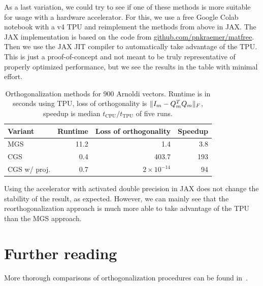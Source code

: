 \documentclass[11pt]{article}
\DeclarePairedDelimiter\norm{\lVert}{\rVert}
\begin{document}
As a last variation, we could try to see if one of these methods is more suitable for usage with a hardware accelerator.
For this, we use a free Google Colab notebook with a v4 TPU and reimplement the methods from above in JAX\@.
The JAX implementation is based on the code from \url{github.com/pnkraemer/matfree}.
Then we use the JAX JIT compiler to automatically take advantage of the TPU\@.
This is just a proof-of-concept and not meant to be truly representative of properly optimized performance, but we see the results in the table with minimal effort.
\begin{table}[ht]
\caption{Orthogonalization methods for $900$ Arnoldi vectors. Runtime is in seconds using TPU, loss of orthogonality is $\norm{I_m - Q_m^T Q_m}_F$, speedup is median $t_{\text{CPU}}/t_{\text{TPU}}$ of five runs.}
\begin{tabular}{lrrr}
    Variant & Runtime & Loss of orthogonality & Speedup\\\toprule
    MGS & 11.2 & 1.4 & 3.8\\
    CGS & 0.4 & 403.7 & 193\\
    CGS w/ proj. & 0.7 & $2\times10^{-14}$ & 94\\
\end{tabular}

\end{table}
Using the accelerator with activated double precision in JAX does not change the stability of the result, as expected.
However, we can mainly see that the reorthogonalization approach is much more able to take advantage of the TPU than the MGS approach.

\section{Further reading}
More thorough comparisons of orthogonalization procedures can be found in~\cite{tafollaLowsynchronizationArnoldiMethods2024, hernandezSLEPcTechnicalReport2007}.

\printbibliography
\end{document}
